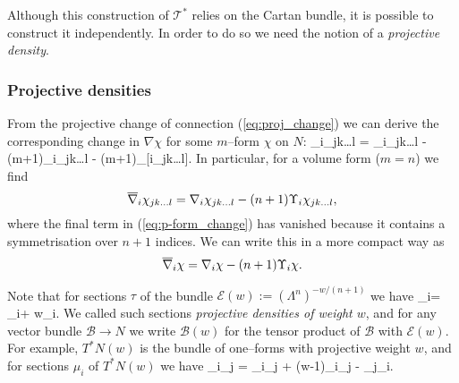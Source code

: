 Although this construction of $\mathcal{T}^*$ relies on the Cartan bundle, it is possible to construct it independently. In order to do so we need the notion of a \textit{projective density}.%
\subsubsection{Projective densities}
From the projective change of connection (\ref{eq:proj_change}) we can derive the corresponding change in $\nabla\chi$ for some $m$--form $\chi$ on $N$:
\be \label{eq:p-form_change}
\ov{\nabla}_i\chi_{jk\dots l} = \nabla_i\chi_{jk\dots l} - (m+1)\Upsilon_i\chi_{jk\dots l} - (m+1)\Upsilon_{[i}\chi_{jk\dots l]}.
\ee
In particular, for a volume form ($m=n$) we find
\[
\overline{\nabla}_i\chi_{jk\dots l} = \nabla_i\chi_{jk\dots l} - (n+1)\Upsilon_i\chi_{jk\dots l},
\]
where the final term in (\ref{eq:p-form_change}) has vanished because it contains a symmetrisation over $n+1$ indices. We can write this in a more compact way as
\[
\overline{\nabla}_i\chi = \nabla_i\chi - (n+1)\Upsilon_i\chi.
\]

Note that for sections $\tau$ of the bundle $\mathcal{E}(w):=(\Lambda^n)^{-w/(n+1)}$ we have
\be \label{eq:ddensity_change}
\ov{\nabla}_i\tau = \nabla_i\tau + w\Upsilon_i\tau.
\ee
We called such sections \textit{projective densities of weight $w$}, and for any vector bundle $\mathcal{B}\rightarrow N$ we write $\mathcal{B}(w)$ for the tensor product of $\mathcal{B}$ with $\mathcal{E}(w)$. For example, $T^*N(w)$ is the bundle of one--forms with projective weight $w$, and for sections $\mu_i$ of $T^*N(w)$ we have
\be \label{eq:dweighted_form_change}
\ov{\nabla}_i\mu_j = \nabla_i\mu_j + (w-1)\Upsilon_i\mu_j - \Upsilon_j\mu_i.
\ee

